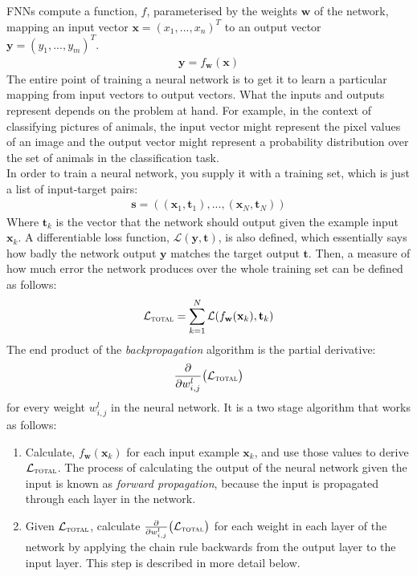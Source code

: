 \documentclass[a4paper, 12pt]{report}
\newcommand{\tit}[1]{\textit{#1}}
\begin{document}
FNNs compute a function, $f$, parameterised by the weights $\mathbf{w}$ of the network, mapping an input vector $\mathbf{x} = (x_1, ..., x_n)^T$ to an output vector $\mathbf{y} = (y_1, ..., y_m)^T$. 
\begin{gather*}
	\mathbf{y} = f_\mathbf{w}(\mathbf{x})
\end{gather*}
The entire point of training a neural network is to get it to learn a particular mapping from input vectors to output vectors. What the inputs and outputs represent depends on the problem at hand. For example, in the context of classifying pictures of animals, the input vector might represent the pixel values of an image and the output vector might represent a probability distribution over the set of animals in the classification task. \\

In order to train a neural network, you supply it with a training set, which is just a list of input-target pairs:
\begin{gather*}
	\mathbf{s} = ((\mathbf{x}_1, \mathbf{t}_1), ..., (\mathbf{x}_N, \mathbf{t}_N))
\end{gather*}
Where $\mathbf{t}_k$ is the vector that the network should output given the example input $\mathbf{x}_k$. A differentiable loss function, $\mathcal{L}(\mathbf{y}, \mathbf{t})$, is also defined, which essentially says how badly the network output $\mathbf{y}$ matches the target output $\mathbf{t}$. Then, a measure of how much error the network produces over the whole training set can be defined as follows:
\begin{gather}
	\mathcal{L}_{\text{\scshape total}} = \sum_{k = 1}^N \mathcal{L}(f_{\mathbf{w}}(\mathbf{x}_k), \mathbf{t}_k)
\end{gather}
The end product of the \tit{backpropagation} algorithm is the partial derivative:
\begin{gather*}
	\frac{\partial}{\partial w_{i,j}^l} \big( \mathcal{L}_{\text{\scshape total}} \big)
\end{gather*}
for every weight $w_{i,j}^l$ in the neural network. It is a two stage algorithm that works as follows:
\begin{enumerate}
\item
	Calculate, $f_{\mathbf{w}}(\mathbf{x}_k)$ for each input example $\mathbf{x}_k$, and use those values to derive $\mathcal{L}_{\text{\scshape total}}$. The process of calculating the output of the neural network given the input is known as \tit{forward propagation}, because the input is propagated through each layer in the network.
\item
	Given $\mathcal{L}_{\text{\scshape total}}$, calculate $\frac{\partial}{\partial w_{i,j}^l} \big( \mathcal{L}_{\text{\scshape total}} \big)$ for each weight in each layer of the network by applying the chain rule backwards from the output layer to the input layer. This step is described in more detail below.
\end{enumerate}
\end{document}
